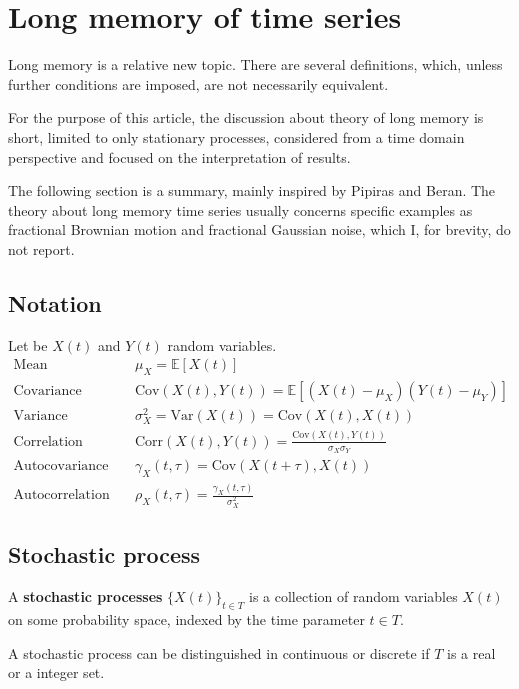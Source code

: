 \section{Long memory of time series}\label{sec:theory}
Long memory is a relative new topic. There are several definitions, which, unless further conditions are imposed, are not necessarily equivalent\cite{pipiras_taqqu_2017}.

For the purpose of this article, the discussion about theory of long memory is short, limited to only stationary processes, considered from a time domain perspective and focused on the interpretation of results.

The following section is a summary, mainly inspired by Pipiras \etal\cite{pipiras_taqqu_2017} and Beran\cite{Beran:2304008}. The theory about long memory time series usually concerns specific examples as fractional Brownian motion and fractional Gaussian noise, which I, for brevity, do not report.

\subsection{Notation}
Let be $X(t)$ and $Y(t)$ random variables.
\begin{align*}
\text{Mean}\quad &\mu_X = \mathbb{E}[X(t)] \\
\text{Covariance}\quad &\text{Cov}(X(t), Y(t)) = \mathbb{E}[(X(t) - \mu_X)(Y(t) - \mu_Y)] \\
\text{Variance}\quad &\sigma^2_X = \text{Var}(X(t)) = \text{Cov}(X(t), X(t)) \\
\text{Correlation}\quad &\text{Corr}(X(t), Y(t)) = \frac{\text{Cov}(X(t), Y(t))}{\sigma_X  \sigma_Y } \\
\text{Autocovariance}\quad &\gamma_X(t, \tau) = \text{Cov}(X(t+\tau), X(t)) \\
\text{Autocorrelation}\quad &\rho_X(t, \tau) = \frac{\gamma_X(t, \tau)}{\sigma^2_X}
\end{align*}

\subsection{Stochastic process}
\begin{definition}
	A \textbf{stochastic processes} $\{X(t)\}_{t \in T}$ is a collection of random variables $X(t)$ on some probability space, indexed by the time parameter $t \in T$.
\end{definition}

A stochastic process can be distinguished in continuous or discrete if $T$ is a real or a integer set.

